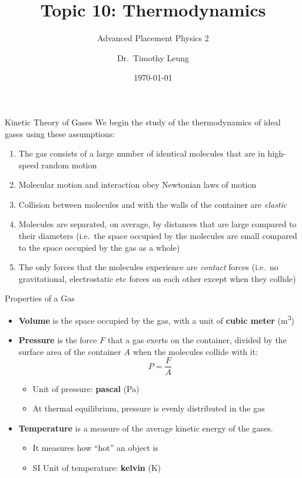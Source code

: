 \documentclass[12pt,aspectratio=169]{beamer}
\title{Topic 10: Thermodynamics}
\subtitle{Advanced Placement Physics 2}
\author[TML]{Dr.\ Timothy Leung}
\institute{Olympiads School}
\date{\today}
\begin{document}
\begin{frame}
  \maketitle
\end{frame}



\begin{frame}{Kinetic Theory of Gases}
  We begin the study of the thermodynamics of ideal gases using these
  assumptions:
  \begin{enumerate}
  \item The gas consists of a large number of identical molecules that are in
    high-speed random motion
  \item Molecular motion and interaction obey Newtonian laws of motion
  \item Collision between molecules and with the walls of the container are
    \emph{elastic}
  \item Molecules are separated, on average, by distances that are large
    compared to their diameters (i.e.\ the space occupied by the molecules are
    small compared to the space occupied by the gas as a whole)
  \item The only forces that the molecules experience are \emph{contact} forces
    (i.e.\ no gravitational, electrostatic etc forces on each other except when
    they collide)
  \end{enumerate}
\end{frame}



\begin{frame}{Properties of a Gas}
  \begin{itemize}
  \item\textbf{Volume} is the space occupied by the gas, with a unit of
    \textbf{cubic meter} (\si{\metre^3})
  \item\textbf{Pressure} is the force $F$ that a gas exerts on the container,
    divided by the surface area of the container $A$ when the molecules collide
    with it:
    \begin{displaymath}
        P=\frac{F}A
    \end{displaymath}
    \begin{itemize}
    \item\vspace{-.2in}Unit of pressure: \textbf{pascal} (\si{\pascal})
    \item At thermal equilibrium, pressure is evenly distributed in the gas
    \end{itemize}
  \item\textbf{Temperature} is a measure of the average kinetic energy of the
    gases.
    \begin{itemize}
    \item It measures how ``hot'' an object is
    \item SI Unit of temperature: \textbf{kelvin} (\si{\kelvin})
    \end{itemize}
  \end{itemize}
\end{frame}
\end{document}
